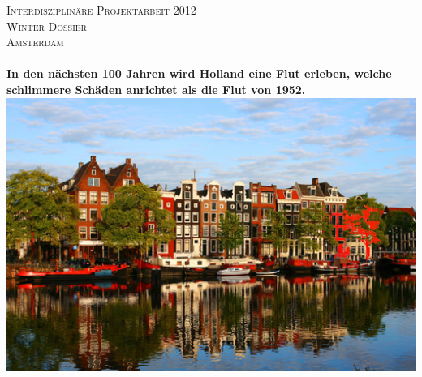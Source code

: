 
\begin{titlepage}

\begin{center}


\textsc{\LARGE Interdisziplinäre Projektarbeit 2012}\\[0.5cm]
\textsc{\LARGE Winter Dossier}\\[1.5cm]

\textsc{\Large Amsterdam}\\[0.5cm]

 
\HRule \\[0.3cm] 
{ \huge \bfseries In den nächsten 100 Jahren wird Holland eine Flut erleben, welche schlimmere Schäden anrichtet als die Flut von 1952.}
\HRule \\[0.3cm] 


\includegraphics[width=1\textwidth]{titelbild.jpg}
\cite{titelbild}   
\\[1cm]   
 

\end{center}
\end{titlepage}
